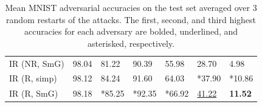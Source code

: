 \begin{table}[!t]
\begin{tabular}{@{}p{2.85cm}P{1.5cm}P{1.2cm}P{0.8cm}P{0.8cm}P{0.8cm}P{0.8cm}@{}}
IR (NR, SmG) &                  98.04 & 81.22 & 90.39 &  55.98 &  28.70 &  4.98 \\
IR (R, simp) &                  98.12 & 84.24 &  91.60 &  64.03 &  \hspace*{-.125cm}*37.90 &  \hspace*{-.125cm}*10.86 \\
IR (R, SmG) &                   98.18 & \hspace*{-.125cm}*85.25 &  \hspace*{-.125cm}*92.35 &  \hspace*{-.125cm}*66.92 &  \underline{41.22} &  \textbf{11.52} \\
\bottomrule
\end{tabular}
\caption{Mean MNIST adversarial accuracies on the test set averaged over 3 random restarts of the attacks. The first, second, and third highest accuracies for each adversary are bolded, underlined, and asterisked, respectively.}
\label{tab:results-mnist}
\end{table}

